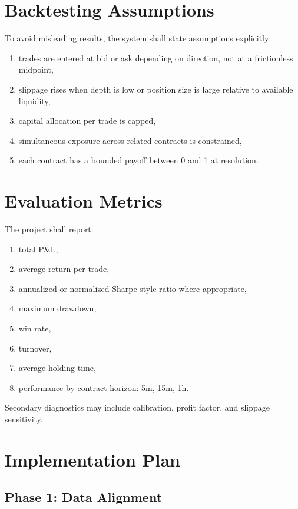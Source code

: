 \documentclass[11pt, letterpaper]{article}
\begin{document}
\section{Backtesting Assumptions}

To avoid misleading results, the system shall state assumptions explicitly:

\begin{enumerate}[nosep]
    \item trades are entered at bid or ask depending on direction, not at a frictionless midpoint,
    \item slippage rises when depth is low or position size is large relative to available liquidity,
    \item capital allocation per trade is capped,
    \item simultaneous exposure across related contracts is constrained,
    \item each contract has a bounded payoff between 0 and 1 at resolution.
\end{enumerate}

\section{Evaluation Metrics}

The project shall report:

\begin{enumerate}[nosep]
    \item total P\&L,
    \item average return per trade,
    \item annualized or normalized Sharpe-style ratio where appropriate,
    \item maximum drawdown,
    \item win rate,
    \item turnover,
    \item average holding time,
    \item performance by contract horizon: 5m, 15m, 1h.
\end{enumerate}

Secondary diagnostics may include calibration, profit factor, and slippage sensitivity.

\section{Implementation Plan}

\subsection{Phase 1: Data Alignment}
\end{document}
